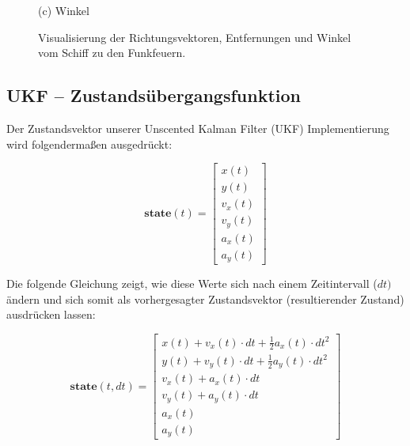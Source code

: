 \documentclass[conference]{IEEEtran}[10pt]
\begin{document}
\begin{figure}[htbp]
{\begin{minipage}{.47\textwidth}
\caption*{(c) Winkel}
\end{minipage}%
}
\caption{Visualisierung der Richtungsvektoren, Entfernungen und Winkel vom Schiff zu den Funkfeuern.}
\end{figure}




\subsection{UKF -- Zustandsübergangsfunktion}


 Der Zustandsvektor unserer Unscented Kalman Filter (UKF) Implementierung wird folgendermaßen ausgedrückt:
 
\[
\textbf{state}(t) = \begin{bmatrix}
x(t) \\
y(t) \\
v_x(t) \\
v_y(t) \\
a_x(t) \\
a_y(t)
\end{bmatrix}
\]

Die folgende Gleichung  zeigt, wie diese Werte sich nach einem Zeitintervall (\(dt)\) ändern und sich somit als vorhergesagter Zustandsvektor (resultierender Zustand) ausdrücken lassen:

\[
\textbf{state}(t, dt) = \begin{bmatrix}
x(t) + v_x(t) \cdot dt + \frac{1}{2} a_x(t) \cdot dt^2 \\
y(t) + v_y(t) \cdot dt + \frac{1}{2} a_y(t) \cdot dt^2 \\
v_x(t) + a_x(t) \cdot dt \\
v_y(t) + a_y(t) \cdot dt \\
a_x(t) \\
a_y(t)
\end{bmatrix}
\]
\end{document}

